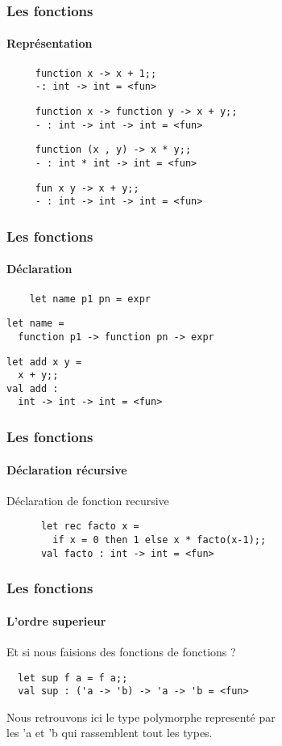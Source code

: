 \begin{frame}[fragile]
	\frametitle{Les fonctions}
	\framesubtitle{Représentation}
	\begin{center}
		\begin{minipage}{10cm}
				\begin{lstlisting}
     function x -> x + 1;;
     -: int -> int = <fun>
				\end{lstlisting}
				\begin{lstlisting}
     function x -> function y -> x + y;;
     - : int -> int -> int = <fun>
				\end{lstlisting}
				\begin{lstlisting}
     function (x , y) -> x * y;;
     - : int * int -> int = <fun>
				\end{lstlisting}
				\begin{lstlisting}
     fun x y -> x + y;;
     - : int -> int -> int = <fun>
				\end{lstlisting}
		\end{minipage}
  \end{center}
\end{frame}

\begin{frame}[fragile]
	\frametitle{Les fonctions}
  	\framesubtitle{Déclaration}
    	\begin{lstlisting}
	let name p1 pn = expr
    	\end{lstlisting}
	\begin{lstlisting}
let name = 
  function p1 -> function pn -> expr
  	\end{lstlisting}
  	\vspace{0.4cm}
  	\begin{lstlisting}
let add x y = 
  x + y;;
val add : 
  int -> int -> int = <fun>
  	\end{lstlisting}
\end{frame}

\begin{frame}[fragile]
	\frametitle{Les fonctions}
	\framesubtitle{Déclaration récursive}
	\begin{block}{Déclaration de fonction recursive} 
	  \begin{lstlisting}
	  let rec facto x = 
	  	if x = 0 then 1 else x * facto(x-1);;
	  val facto : int -> int = <fun>
	  \end{lstlisting}
	\end{block}
\end{frame}

\begin{frame}[fragile]
	\frametitle{Les fonctions}
  	\framesubtitle{L'ordre superieur}
  	Et si nous faisions des fonctions de fonctions ? 
 	\begin{lstlisting}
  let sup f a = f a;;
  val sup : ('a -> 'b) -> 'a -> 'b = <fun>
 	\end{lstlisting}
	Nous retrouvons ici le type polymorphe representé par\\
	les 'a et 'b qui rassemblent tout les types.
\end{frame}

